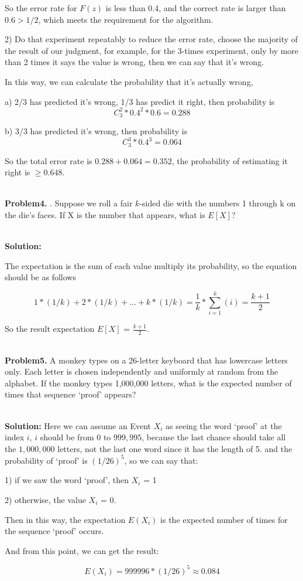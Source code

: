 \documentclass{article}
\begin{document}
So the error rate for $F(z)$ is less than 0.4, and the correct rate is larger than $0.6 > 1/2$, which meets the requirement for the algorithm.

2) Do that experiment repeatably to reduce the error rate, choose the majority of the result of our judgment, for example, for the 3-times experiment, only by more than 2 times it says the value is wrong, then we can say that it's wrong.

In this way, we can calculate the probability that it's actually wrong,

a) 2/3 has predicted it's wrong, 1/3 has predict it right, then probability is
$$C_3^2 * {0.4}^2 * 0.6 = 0.288$$

b) 3/3 has predicted it's wrong, then probability is
$$C_3^3 * {0.4}^3 = 0.064$$

So the total error rate is $0.288+0.064=0.352$, the probability of estimating it right is $\ge 0.648$.

~\\


\noindent \textbf{Problem4.} . Suppose we roll a fair $k$-sided die with the numbers 1 through k on the die's faces. If X is the number that appears, what is $E[X]$?

~\\

\noindent \textbf{Solution:}

The expectation is the sum of each value multiply its probability, so the equation should be as follows

$$ 1 * (1/k) + 2 * (1/k) + ... + k * (1/k) = \frac{1}{k} * \sum_{i=1}^{k}(i) = \frac{k+1}{2}$$

So the result expectation $E[X]$ = $\frac{k+1}{2}$.

~\\

\noindent \textbf{Problem5.} A monkey types on a 26-letter keyboard that has lowercase letters only. Each letter is chosen independently and uniformly at random from the alphabet. If the monkey types 1,000,000 letters, what is
the expected number of times that sequence `proof' appears?

~\\

\noindent \textbf{Solution:}
Here we can assume an Event $X_i$ as seeing the word `proof' at the index $i$, $i$ should be from 0 to $999,995$, because the last chance should take all the $1,000,000$ letters, not the last one word since it has the length of 5.
and the probability of `proof' is $(1/26)^5$, so we can say that:

1) if we saw the word `proof', then $X_i$ = 1

2) otherwise, the value $X_i$ = 0.

Then in this way, the expectation $E(X_i)$ is the expected number of times for the sequence `proof' occurs.

And from this point, we can get the result:

$$E(X_i) = 999996 * (1/26)^5 \approx 0.084$$

~\\ %
\end{document}
